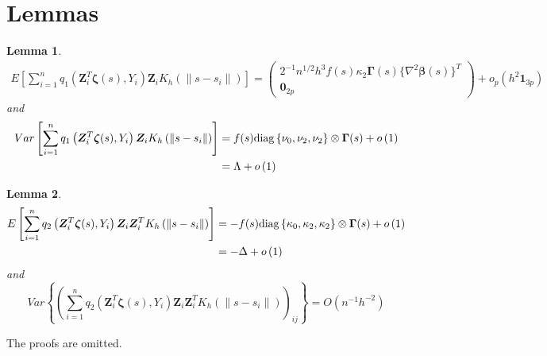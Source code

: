 \documentclass[authoryear,review, 12pt]{elsarticle}
\newtheorem{lem}{Lemma}
\begin{document}
\section{Lemmas}
\begin{lem}
\label{lemma:omega}
\begin{multline*}
E\left[\sum_{i=1}^{n}q_{1}\left(\bm{Z}_{i}^{T}\bm{\zeta}(s),Y_{i}\right)\bm{Z}_{i}K_{h}\left(\|s-s_{i}\|\right)\right]=
\left(\begin{array}{c}
2^{-1}n^{1/2}h^{3}f(s)\kappa_{2}\bm{\Gamma}(s) \{\nabla^{2}\bm{\beta}(s) \}^{T}\\
\bm{0}_{2p}
\end{array}\right)+o_{p}\left(h^{2}\bm{1}_{3p}\right)
\end{multline*}
and
\begin{align*}
Var\left[\sum_{i=1}^{n}q_{1}\left(\bm{Z}_{i}^{T}\bm{\zeta}(s),Y_{i}\right)\bm{Z}_{i}K_{h}\left(\|s-s_{i}\|\right)\right] &= f(s){\rm diag}\left\{ \nu_{0},\nu_{2},\nu_{2}\right\} \otimes\bm{\Gamma}(s)+o\left(1\right)\\
&= \Lambda+o\left(1\right)
\end{align*}
\end{lem}

\begin{lem}
\label{lemma:delta}
\begin{align*}
E\left[\sum_{i=1}^{n}q_{2}\left(\bm{Z}_{i}^{T}\bm{\zeta}(s),Y_{i}\right)\bm{Z}_{i}\bm{Z}_{i}^{T}K_{h}\left(\|s-s_{i}\|\right)\right] &= -f(s){\rm diag}\left\{ \kappa_{0},\kappa_{2},\kappa_{2}\right\} \otimes\bm{\Gamma}(s)+o\left(1\right)\\
&= -\Delta+o\left(1\right)
\end{align*}
and
\[
Var\left\{ \left(\sum_{i=1}^{n}q_{2}\left(\bm{Z}_{i}^{T}\bm{\zeta}(s),Y_{i}\right)\bm{Z}_{i}\bm{Z}_{i}^{T}K_{h}\left(\|s-s_{i}\|\right)\right)_{ij}\right\} =O\left(n^{-1}h^{-2}\right)
\]
\end{lem}

The proofs are omitted.
\end{document}
